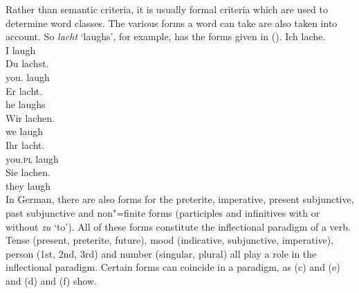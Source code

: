 Rather than semantic criteria, it is usually formal criteria which are used to determine word classes. The various forms a word can take
are also taken into account. So \emph{lacht} `laughs', for example, has the forms given in (). 
\eal
\ex 
\gll Ich lache.\\
     I laugh\\
\ex 
\gll Du lachst.\\
     you.\sg{} laugh\\
\ex 
\gll Er lacht.\\
     he laughs\\
\ex 
\gll Wir lachen.\\
     we laugh\\
\ex 
\gll Ihr lacht.\\
     you.\textsc{pl} laugh\\
\ex 
\gll Sie lachen.\\
     they laugh\\
\zl
In German, there are also forms for the preterite, imperative, present subjunctive, past subjunctive and non"=finite forms 
(participles and infinitives with or without \emph{zu} `to'). All of these forms constitute the
inflectional paradigm of a verb. Tense  (present,
preterite, future),
mood (indicative, subjunctive, imperative),
person (1st, 2nd, 3rd) and number (singular, plural) all play a role in the
inflectional paradigm. Certain forms can coincide in a paradigm, as (c) and (e) and
(d) and (f) show.

